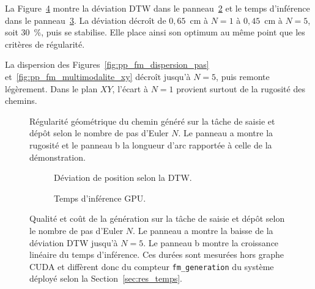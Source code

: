 La Figure~\ref{fig:pp_fm_euler_steps} montre la déviation \ac{DTW} dans le panneau~\ref{fig:pp_fm_steps_dtw} et le temps d'inférence dans le panneau~\ref{fig:pp_fm_steps_temps}. La déviation décroît de $0{,}65$~cm à $N=1$ à $0{,}45$~cm à $N=5$, soit $30$~\%, puis se stabilise. Elle place ainsi son optimum au même point que les critères de régularité.

La dispersion des Figures~\ref{fig:pp_fm_dispersion_pas} et~\ref{fig:pp_fm_multimodalite_xy} décroît jusqu'à $N=5$, puis remonte légèrement. Dans le plan $XY$, l'écart à $N=1$ provient surtout de la rugosité des chemins.

\begin{figure}[!htbp]
    \centering
    
    \caption[Régularité géométrique du chemin sur la saisie et dépôt]{Régularité géométrique du chemin généré sur la tâche de saisie et dépôt selon le nombre de pas d'Euler $N$. Le panneau a montre la rugosité et le panneau b la longueur d'arc rapportée à celle de la démonstration.}\label{fig:pp_fm_structure}
\end{figure}

\begin{figure}[!htbp]
    \centering
    \begin{subfigure}[b]{0.48\textwidth}
        \centering
        
        \caption{Déviation de position selon la \ac{DTW}.}\label{fig:pp_fm_steps_dtw}
    \end{subfigure}
    \hfill
    \begin{subfigure}[b]{0.48\textwidth}
        \centering
        
        \caption{Temps d'inférence \ac{GPU}.}\label{fig:pp_fm_steps_temps}
    \end{subfigure}
    \caption{Qualité et coût de la génération sur la tâche de saisie et dépôt selon le nombre de pas d'Euler $N$. Le panneau a montre la baisse de la déviation \ac{DTW} jusqu'à $N=5$. Le panneau b montre la croissance linéaire du temps d'inférence. Ces durées sont mesurées hors graphe \ac{CUDA} et diffèrent donc du compteur \texttt{fm\_generation} du système déployé selon la Section~\ref{sec:res_temps}.}\label{fig:pp_fm_euler_steps}
\end{figure}

